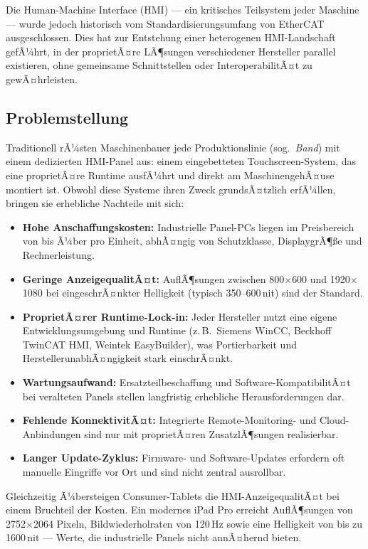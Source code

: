 ﻿\documentclass[12pt,a4paper]{article}
\begin{document}
Die Human-Machine Interface (HMI) --- ein kritisches Teilsystem jeder Maschine --- wurde
jedoch historisch vom Standardisierungsumfang von EtherCAT ausgeschlossen. Dies hat
zur Entstehung einer heterogenen HMI-Landschaft gefÃ¼hrt, in der proprietÃ¤re LÃ¶sungen
verschiedener Hersteller parallel existieren, ohne gemeinsame Schnittstellen oder
InteroperabilitÃ¤t zu gewÃ¤hrleisten.

\subsection{Problemstellung}

Traditionell rÃ¼sten Maschinenbauer jede Produktionslinie (sog.\ \emph{Band}) mit einem
dedizierten HMI-Panel aus: einem eingebetteten Touchscreen-System, das eine proprietÃ¤re
Runtime ausfÃ¼hrt und direkt am MaschinengehÃ¤use montiert ist. Obwohl diese Systeme
ihren Zweck grundsÃ¤tzlich erfÃ¼llen, bringen sie erhebliche Nachteile mit sich:

\begin{itemize}[leftmargin=2em]
  \item \textbf{Hohe Anschaffungskosten:} Industrielle Panel-PCs liegen im Preisbereich
    von  bis Ã¼ber  pro Einheit, abhÃ¤ngig von Schutzklasse,
    DisplaygrÃ¶\ss{}e und Rechnerleistung.
  \item \textbf{Geringe AnzeigequalitÃ¤t:} AuflÃ¶sungen zwischen 800$\times$600 und
    1920$\times$1080 bei eingeschrÃ¤nkter Helligkeit (typisch 350--600\,nit) sind der
    Standard.
  \item \textbf{ProprietÃ¤rer Runtime-Lock-in:} Jeder Hersteller nutzt eine eigene
    Entwicklungsumgebung und Runtime (z.\,B.\ Siemens WinCC, Beckhoff TwinCAT HMI,
    Wein\-tek EasyBuilder), was Portierbarkeit und HerstellerunabhÃ¤ngigkeit stark einschrÃ¤nkt.
  \item \textbf{Wartungsaufwand:} Ersatzteilbeschaffung und Software-KompatibilitÃ¤t bei
    veralteten Panels stellen langfristig erhebliche Herausforderungen dar.
  \item \textbf{Fehlende KonnektivitÃ¤t:} Integrierte Remote-Monitoring- und
    Cloud-Anbindungen sind nur mit proprietÃ¤ren ZusatzlÃ¶sungen realisierbar.
  \item \textbf{Langer Update-Zyklus:} Firmware- und Software-Updates erfordern oft
    manuelle Eingriffe vor Ort und sind nicht zentral ausrollbar.
\end{itemize}

Gleichzeitig Ã¼bersteigen Consumer-Tablets die HMI-AnzeigequalitÃ¤t bei einem Bruchteil
der Kosten. Ein modernes iPad Pro erreicht AuflÃ¶sungen von 2752$\times$2064 Pixeln,
Bildwiederholraten von 120\,Hz sowie eine Helligkeit von bis zu 1600\,nit --- Werte, die
industrielle Panels nicht annÃ¤hernd bieten.
\end{document}
